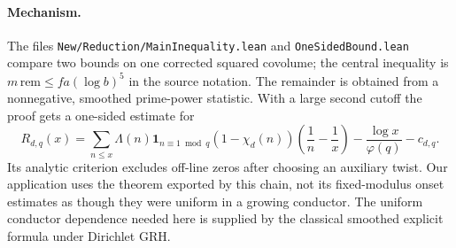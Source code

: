 \documentclass[11pt]{article}
\theoremstyle{remark}\newtheorem{remark}[theorem]{Remark}
\begin{document}
\paragraph{Mechanism.} The files \texttt{New/Reduction/MainInequality.lean} and \texttt{OneSidedBound.lean} \cite{ineq,oneside} compare two bounds on one corrected squared covolume; the central inequality is $m\,\mathrm{rem}\le fa(\log b)^5$ in the source notation. The remainder is obtained from a nonnegative, smoothed prime-power statistic. With a large second cutoff the proof gets a one-sided estimate for
\[
R_{d,q}(x)=\sum_{n\le x}\Lambda(n)\mathbf1_{n\equiv1\bmod q}(1-\chi_d(n))
\left(\frac1n-\frac1x\right)-\frac{\log x}{\varphi(q)}-c_{d,q}.
\]
Its analytic criterion excludes off-line zeros after choosing an auxiliary twist. Our application uses the theorem exported by this chain, not its fixed-modulus onset estimates as though they were uniform in a growing conductor. The uniform conductor dependence needed here is supplied by the classical smoothed explicit formula under Dirichlet GRH.
\end{document}
